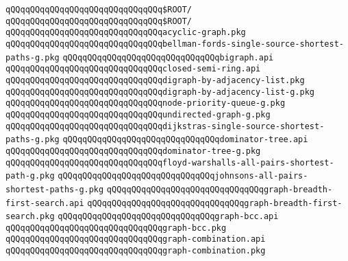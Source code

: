 \newline
\verb|qQQqqQQqqQQqqQQqqQQqqQQqqQQqqQQq$ROOT/|\newline
\verb|qQQqqQQqqQQqqQQqqQQqqQQqqQQqqQQq$ROOT/|\newline
\newline
\verb|qQQqqQQqqQQqqQQqqQQqqQQqqQQqqQQqacyclic-graph.pkg|\newline
\verb|qQQqqQQqqQQqqQQqqQQqqQQqqQQqqQQqbellman-fords-single-source-shortest-paths-g.pkg|\newline
\verb|qQQqqQQqqQQqqQQqqQQqqQQqqQQqqQQqbigraph.api|\newline
\verb|qQQqqQQqqQQqqQQqqQQqqQQqqQQqqQQqclosed-semi-ring.api|\newline
\verb|qQQqqQQqqQQqqQQqqQQqqQQqqQQqqQQqdigraph-by-adjacency-list.pkg|\newline
\verb|qQQqqQQqqQQqqQQqqQQqqQQqqQQqqQQqdigraph-by-adjacency-list-g.pkg|\newline
\verb|qQQqqQQqqQQqqQQqqQQqqQQqqQQqqQQqnode-priority-queue-g.pkg|\newline
\verb|qQQqqQQqqQQqqQQqqQQqqQQqqQQqqQQqundirected-graph-g.pkg|\newline
\verb|qQQqqQQqqQQqqQQqqQQqqQQqqQQqqQQqdijkstras-single-source-shortest-paths-g.pkg|\newline
\verb|qQQqqQQqqQQqqQQqqQQqqQQqqQQqqQQqdominator-tree.api|\newline
\verb|qQQqqQQqqQQqqQQqqQQqqQQqqQQqqQQqdominator-tree-g.pkg|\newline
\verb|qQQqqQQqqQQqqQQqqQQqqQQqqQQqqQQqfloyd-warshalls-all-pairs-shortest-path-g.pkg|\newline
\verb|qQQqqQQqqQQqqQQqqQQqqQQqqQQqqQQqjohnsons-all-pairs-shortest-paths-g.pkg|\newline
\verb|qQQqqQQqqQQqqQQqqQQqqQQqqQQqqQQqgraph-breadth-first-search.api|\newline
\verb|qQQqqQQqqQQqqQQqqQQqqQQqqQQqqQQqgraph-breadth-first-search.pkg|\newline
\verb|qQQqqQQqqQQqqQQqqQQqqQQqqQQqqQQqgraph-bcc.api|\newline
\verb|qQQqqQQqqQQqqQQqqQQqqQQqqQQqqQQqgraph-bcc.pkg|\newline
\verb|qQQqqQQqqQQqqQQqqQQqqQQqqQQqqQQqgraph-combination.api|\newline
\verb|qQQqqQQqqQQqqQQqqQQqqQQqqQQqqQQqgraph-combination.pkg|\newline
